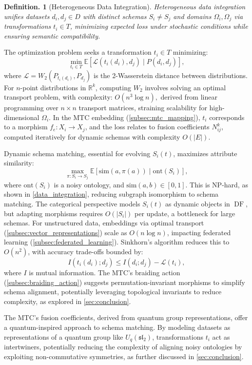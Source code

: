 \documentclass{amsart}
\newtheorem{defn}[thm]{Definition.}
\newcommand\R{\mathbb R}
\DeclareMathOperator\DF{DF}
\begin{document}
\begin{defn}[Heterogeneous Data Integration]
Heterogeneous data integration unifies datasets \( d_i, d_j \in D \) with distinct schemas \( S_i \neq S_j \) and domains \( \Omega_i, \Omega_j \) via transformations \( t_i \in T \), minimizing expected loss under stochastic conditions while ensuring semantic compatibility.
\end{defn}

The optimization problem seeks a transformation \( t_i \in T \) minimizing:
\[
\min_{t_i \in T} \mathbb{E}[\mathcal{L}(t_i(d_i), d_j) \mid P(d_i, d_j)],
\]
where \( \mathcal{L} = W_2(P_{t_i(d_i)}, P_{d_j}) \) is the 2-Wasserstein distance between distributions. For \( n \)-point distributions in \( \R^k \), computing \( W_2 \) involves solving an optimal transport problem, with complexity:
$
O(n^3 \log n),
$
derived from linear programming over \( n \times n \) transport matrices, straining scalability for high-dimensional \( \Omega_i \). In the MTC embedding (\cref{subsec:mtc_mapping}), \( t_i \) corresponds to a morphism \( f_e: X_i \to X_j \), and the loss relates to fusion coefficients \( N_{ij}^k \), computed iteratively for dynamic schemas with complexity \( O(|E|) \).

Dynamic schema matching, essential for evolving \( S_i(t) \), maximizes attribute similarity:
\[
\max_{\pi: S_i \to S_j} \mathbb{E}[\text{sim}(a, \pi(a)) \mid \text{ont}(S_i)],
\]
where \( \text{ont}(S_i) \) is a noisy ontology, and \( \text{sim}(a, b) \in [0, 1] \). This is NP-hard, as shown in \cref{data_integration}, reducing subgraph isomorphism to schema matching. The categorical perspective models \( S_i(t) \) as dynamic objects in \( \DF \), but adapting morphisms requires \( O(|S_i|) \) per update, a bottleneck for large schemas. For unstructured data, embeddings via optimal transport (\cref{subsec:vector_representations}) scale as \( O(n \log n) \), impacting federated learning (\cref{subsec:federated_learning}). Sinkhorn’s algorithm reduces this to \( O(n^2) \), with accuracy trade-offs bounded by:
\[
I(t_i(d_i); d_j) \leq I(d_i; d_j) - \mathcal{L}(t_i),
\]
where \( I \) is mutual information. The MTC’s braiding action (\cref{subsec:braiding_action}) suggests permutation-invariant morphisms to simplify schema alignment, potentially leveraging topological invariants to reduce complexity, as explored in \cref{sec:conclusion}.

The MTC’s fusion coefficients, derived from quantum group representations, offer a quantum-inspired approach to schema matching. By modeling datasets as representations of a quantum group like \( U_q(\mathfrak{sl}_2) \), transformations \( t_i \) act as intertwiners, potentially reducing the complexity of aligning noisy ontologies by exploiting non-commutative symmetries, as further discussed in \cref{sec:conclusion}.
\end{document}

